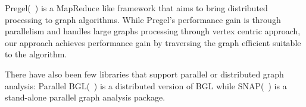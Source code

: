 Pregel(~\cite{malewicz2010pregel}) is a MapReduce like framework that aims to 
bring distributed processing to graph algorithms. While Pregel's performance 
gain is through parallelism and handles large graphs processing through 
vertex centric approach, our approach achieves performance gain by traversing 
the graph efficient suitable to the algorithm.

There have also been few libraries that support parallel or distributed graph 
analysis: Parallel BGL(~\cite{gregor2005parallel})  is a distributed version of 
BGL while SNAP(~\cite{bader2008snap})  is a stand-alone parallel graph analysis 
package.
